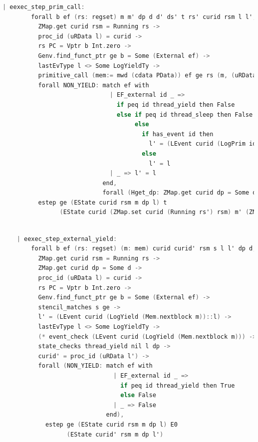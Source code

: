 \begin{lstlisting}[language=C]
    | eexec_step_prim_call:
        forall b ef (rs: regset) m m' dp d d' ds' t rs' curid rsm l l',
          ZMap.get curid rsm = Running rs ->
          proc_id (uRData l) = curid ->
          rs PC = Vptr b Int.zero ->
          Genv.find_funct_ptr ge b = Some (External ef) ->
          lastEvType l <> Some LogYieldTy ->
          primitive_call (mem:= mwd (cdata PData)) ef ge rs (m, (uRData l, d)) t rs' (m', (ds', d')) ->
          forall NON_YIELD: match ef with
                              | EF_external id _ => 
                                if peq id thread_yield then False
                                else if peq id thread_sleep then False
                                     else
                                       if has_event id then
                                         l' = (LEvent curid (LogPrim id nil 0 (snap_func d)) :: l)
                                       else
                                         l' = l
                              | _ => l' = l
                            end,
                            forall (Hget_dp: ZMap.get curid dp = Some d),
          estep ge (EState curid rsm m dp l) t 
                (EState curid (ZMap.set curid (Running rs') rsm) m' (ZMap.set curid (Some d') dp) l')
\end{lstlisting}

\begin{lstlisting}[language=C]

    | eexec_step_external_yield:
        forall b ef (rs: regset) (m: mem) curid curid' rsm s l l' dp d,
          ZMap.get curid rsm = Running rs ->
          ZMap.get curid dp = Some d ->
          proc_id (uRData l) = curid ->
          rs PC = Vptr b Int.zero ->
          Genv.find_funct_ptr ge b = Some (External ef) ->
          stencil_matches s ge ->
          l' = (LEvent curid (LogYield (Mem.nextblock m))::l) ->
          lastEvType l <> Some LogYieldTy ->
          (* event_check (LEvent curid (LogYield (Mem.nextblock m))) -> *)
          state_checks thread_yield nil l dp ->
          curid' = proc_id (uRData l') ->
          forall (NON_YIELD: match ef with
                               | EF_external id _ => 
                                 if peq id thread_yield then True
                                 else False
                               | _ => False
                             end),
            estep ge (EState curid rsm m dp l) E0
                  (EState curid' rsm m dp l')
\end{lstlisting}

